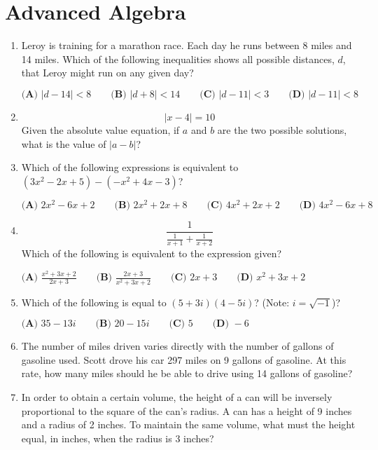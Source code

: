 \documentclass[../satmath.tex]{subfiles}
\begin{document}
\chapter{Advanced Algebra}
\begin{enumerate}[label=\bfseries\arabic*.]

\item Leroy is training for a marathon race. Each day he runs between 8 miles and 14 miles. Which of the following inequalities shows all possible 
distances, $d$, that Leroy might run on any given day?

$\textbf{(A) } |d-14|<8 \qquad \textbf{(B) } |d+8|<14 \qquad \textbf{(C) } |d-11|<3 \qquad \textbf{(D) } |d-11|<8$
 
\item  
\[|x-4|=10\]
Given the absolute value equation, if $a$ and $b$ are the two possible solutions, what is the value of $|a-b|$?
 
\item Which of the following expressions is equivalent to $(3x^2-2x+5)-(-x^2+4x-3)$?

$\textbf{(A) } 2x^2-6x+2 \qquad \textbf{(B) } 2x^2+2x+8 \qquad \textbf{(C) } 4x^2+2x+2 \qquad \textbf{(D) } 4x^2-6x+8$

\item
\[\frac{1}{\frac{1}{x+1}+\frac{1}{x+2}}\]
Which of the following is equivalent to the expression given?

$\textbf{(A) } \frac{x^2+3x+2}{2x+3} \qquad \textbf{(B) } \frac{2x+3}{x^2+3x+2} \qquad \textbf{(C) } 2x+3 \qquad \textbf{(D) } x^2+3x+2$

\item Which of the following is equal to $(5+3i)(4-5i)$? (Note: $i=\sqrt{-1}$)?

$\textbf{(A) } 35-13i \qquad \textbf{(B) } 20-15i \qquad \textbf{(C) } 5 \qquad \textbf{(D) } -6$

\item The number of miles driven varies directly with the number of gallons of gasoline used. Scott drove his car 297 miles on 9 gallons of gasoline.
At this rate, how many miles should he be able to drive using 14 gallons of gasoline?
 
\item In order to obtain a certain volume, the height of a can will be inversely proportional to the square of the can's radius. A can has 
a height of 9 inches and a radius of 2 inches. To maintain the same volume, what must the height equal, in inches, when the radius is 3 inches?
 

\end{enumerate}
\end{document}

